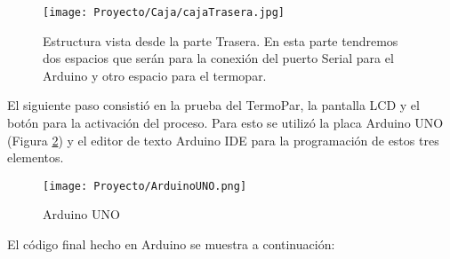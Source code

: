 \begin{figure}[!h]
    \centering
    \texttt{[image: Proyecto/Caja/cajaTrasera.jpg]}
    \caption{Estructura vista desde la parte Trasera. En esta parte tendremos dos espacios que serán para la conexión del puerto Serial para el Arduino y otro espacio para el termopar.}
    \label{cajaTrasera}
\end{figure}
\clearpage
El siguiente paso consistió en la prueba del TermoPar, la pantalla LCD y el botón para la activación del proceso. Para esto se utilizó la placa Arduino UNO (Figura \ref{arduino}) y el editor de texto Arduino IDE para la programación de estos tres elementos.

\begin{figure}[h]
\centering
\texttt{[image: Proyecto/ArduinoUNO.png]}
\caption{Arduino UNO}
\label{arduino}
\end{figure}

El código final hecho en Arduino se muestra a continuación:

